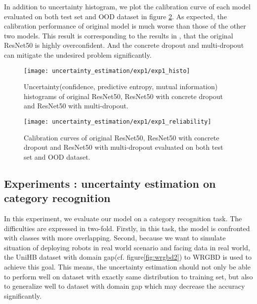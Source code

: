 In addition to uncertainty histogram, we plot the calibration curve of each model evaluated on both test set and OOD dataset in figure \ref{exp1_reliability}. As expected, the calibration performance of original model is much worse than those of the other two models. This result is corresponding to the results in \cite{guo2017calibration}, that the original ResNet50 is highly overconfident. And the concrete dropout and multi-dropout can mitigate the undesired problem significantly.

\begin{figure}[H]
	\begin{center}
		\texttt{[image: uncertainty\_estimation/exp1/exp1\_histo]}
		\caption{Uncertainty(confidence, predictive entropy, mutual information) histograms of original ResNet50, ResNet50 with concrete dropout and ResNet50 with multi-dropout.}		
		\label{exp1_histo}
	\end{center}
\end{figure}
\begin{figure}[H]
	\begin{center}
		\texttt{[image: uncertainty\_estimation/exp1/exp1\_reliability]}
		\caption{Calibration curves of original ResNet50, ResNet50 with concrete dropout and ResNet50 with multi-dropout evaluated on both test set and OOD dataset.}		
		\label{exp1_reliability}
	\end{center}
\end{figure}

\subsection{Experiments : uncertainty estimation on category recognition}
In this experiment, we evaluate our model on a category recognition task. The difficulties are expressed in two-fold. Firstly, in this task, the model is confronted with classes with more overlapping. Second, because we want to simulate situation of deploying robots in real world scenario and facing data in real world, the UniHB dataset with domain gap(cf. figure\ref{fig:wrgbd2}) to WRGBD is used to achieve this goal. This means, the uncertainty estimation should not only be able to perform well on dataset with exactly same distribution to training set, but also to generalize well to dataset with domain gap which may decrease the accuracy significantly.

